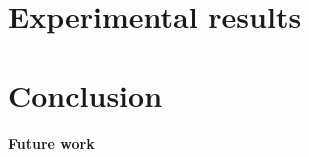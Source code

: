 \documentclass[twoside,a4paper]{article}
\begin{document}
\section{Experimental results}

\section{Conclusion}


\paragraph{Future work}






                                                                
\end{document}
